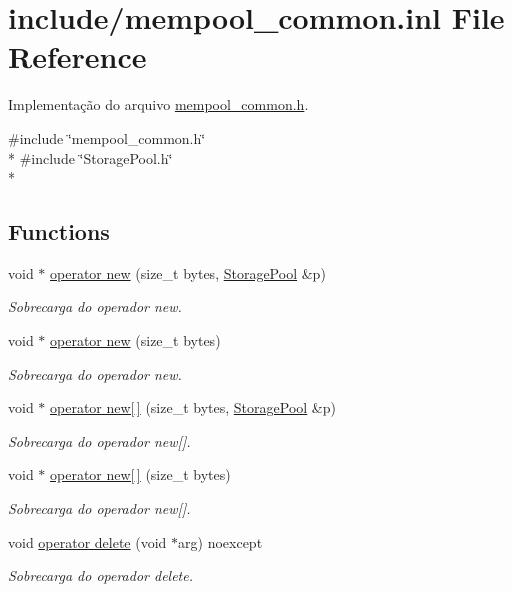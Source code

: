 \hypertarget{mempool__common_8inl}{}\section{include/mempool\+\_\+common.inl File Reference}
\label{mempool__common_8inl}


Implementação do arquivo \hyperlink{mempool__common_8h}{mempool\+\_\+common.\+h}.  


{\ttfamily \#include \char`\"{}mempool\+\_\+common.\+h\char`\"{}}\\*
{\ttfamily \#include \char`\"{}Storage\+Pool.\+h\char`\"{}}\\*
\subsection*{Functions}
\begin{DoxyCompactItemize}
\item 
void $\ast$ \hyperlink{mempool__common_8inl_ac5e850be5277fe21a0924d90adf671e6}{operator new} (size\+\_\+t bytes, \hyperlink{class_storage_pool}{Storage\+Pool} \&p)
\begin{DoxyCompactList}\small\item\em Sobrecarga do operador new. \end{DoxyCompactList}\item 
void $\ast$ \hyperlink{mempool__common_8inl_a123745987bcf8adf0e5fa614a20c0137}{operator new} (size\+\_\+t bytes)
\begin{DoxyCompactList}\small\item\em Sobrecarga do operador new. \end{DoxyCompactList}\item 
void $\ast$ \hyperlink{mempool__common_8inl_a416a45bfcfcd41af3cb1caafca84761d}{operator new\mbox{[}$\,$\mbox{]}} (size\+\_\+t bytes, \hyperlink{class_storage_pool}{Storage\+Pool} \&p)
\begin{DoxyCompactList}\small\item\em Sobrecarga do operador new\mbox{[}\mbox{]}. \end{DoxyCompactList}\item 
void $\ast$ \hyperlink{mempool__common_8inl_a9e317f35c05046679fe9434fb519068f}{operator new\mbox{[}$\,$\mbox{]}} (size\+\_\+t bytes)
\begin{DoxyCompactList}\small\item\em Sobrecarga do operador new\mbox{[}\mbox{]}. \end{DoxyCompactList}\item 
void \hyperlink{mempool__common_8inl_a49aeafb236d8e2fa3f1b687b6e0122db}{operator delete} (void $\ast$arg) noexcept
\begin{DoxyCompactList}\small\item\em Sobrecarga do operador delete. \end{DoxyCompactList}\end{DoxyCompactItemize}


